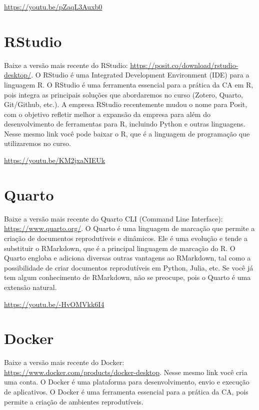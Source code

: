 \documentclass[
  a4paper,
]{book}
\begin{document}
\url{https://youtu.be/pZaqL3Auxb0}

\section*{RStudio}\label{sec-rstudioprework}


Baixe a versão mais recente do RStudio:
\url{https://posit.co/download/rstudio-desktop/}. O RStudio é uma
Integrated Development Environment (IDE) para a linguagem R. O RStudio é
uma ferramenta essencial para a prática da CA em R, pois integra as
principais soluções que abordaremos no curso (Zotero, Quarto,
Git/Github, etc.). A empresa RStudio recentemente mudou o nome para
Posit, com o objetivo refletir melhor a expansão da empresa para além do
desenvolvimento de ferramentas para R, incluindo Python e outras
linguagens. Nesse mesmo link você pode baixar o R, que é a linguagem de
programação que utilizaremos no curso.

\url{https://youtu.be/KM2jxaNIEUk}

\section*{Quarto}\label{sec-quartoprework}


Baixe a versão mais recente do Quarto CLI (Command Line Interface):
\url{https://www.quarto.org/}. O Quarto é uma linguagem de marcação que
permite a criação de documentos reprodutíveis e dinâmicos. Ele é uma
evolução e tende a substituir o RMarkdown, que é a principal linguagem
de marcação do R. O Quarto engloba e adiciona diversas outras vantagens
ao RMarkdown, tal como a possibilidade de criar documentos reprodutíveis
em Python, Julia, etc. Se você já tem algum conhecimento de RMarkdown,
não se preocupe, pois o Quarto é uma extensão natural.

\url{https://youtu.be/-HvOMVkk6I4}

\section*{Docker}\label{sec-dockerprework}


Baixe a versão mais recente do Docker:
\url{https://www.docker.com/products/docker-desktop}. Nesse mesmo link
você cria uma conta. O Docker é uma plataforma para desenvolvimento,
envio e execução de aplicativos. O Docker é uma ferramenta essencial
para a prática da CA, pois permite a criação de ambientes reprodutíveis.
\end{document}
